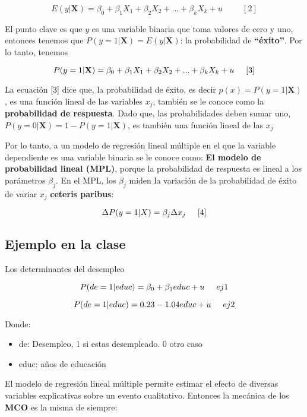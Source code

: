 \documentclass[
  letterpaper,
  DIV=11,
  numbers=noendperiod]{scrreprt}
\begin{document}
\[
E(y|\mathbf{X})=\beta_0+\beta_1X_1+\beta_2X_2+...+\beta_kX_k+u \hspace{1cm}[2]
\]

El punto clave es que \(y\) es una variable binaria que toma valores de
cero y uno, entonces tenemos que \(P(y=1|\mathbf{X})=E(y|\mathbf{X})\):
la probabilidad de \textbf{``éxito''}. Por lo tanto, tenemos

\[
P(y=1|\mathbf{X})=\beta_0+\beta_1X_1+\beta_2X_2+...+\beta_kX_k+u \hspace{0.5cm} [3]
\]

La ecuación {[}3{]} dice que, la probabilidad de éxito, es decir
\(p(x)=P(y=1|\mathbf{X})\), es una función lineal de las variables
\(x_j\), también se le conoce como la \textbf{probabilidad de
respuesta}. Dado que, las probabilidades deben sumar uno,
\(P(y=0|\mathbf{X})=1-P(y=1|\mathbf{X})\), es también una función lineal
de las \(x_j\)

Por lo tanto, a un modelo de regresión lineal múltiple en el que la
variable dependiente es una variable binaria se le conoce como:
\textbf{El modelo de probabilidad lineal (MPL)}, porque la probabilidad
de respuesta es lineal a los parámetros \(\beta_j\). En el MPL, los
\(\beta_j\) miden la variación de la probabilidad de éxito de variar
\(x_j\) \textbf{ceteris paribus}:

\[
\Delta P(y=1|X)=\beta_j \Delta x_j \hspace{0.5cm} [4]
\]

\subsection{Ejemplo en la clase}\label{ejemplo-en-la-clase}

Los determinantes del desempleo

\[
P(de=1|educ)=\beta_0+\beta_1educ+u \hspace{0.5cm} ej1
\]

\[
P(de=1|educ)=0.23-1.04educ+u \hspace{0.5cm} ej2
\]

Donde:

\begin{itemize}
\item
  de: Desempleo, 1 si estas desempleado. 0 otro caso
\item
  educ: años de educación
\end{itemize}

El modelo de regresión lineal múltiple permite estimar el efecto de
diversas variables explicativas sobre un evento cualitativo. Entonces la
mecánica de los \textbf{MCO} es la misma de siempre:
\end{document}
